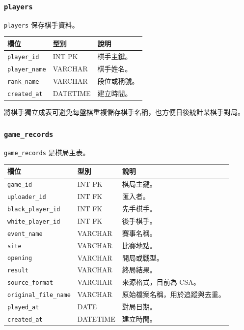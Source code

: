\documentclass[12pt,a4paper,fontset=none]{ctexart}
\begin{document}
\subsubsection{\texttt{players}}

\texttt{players} 保存棋手資料。

\begin{longtable}{p{}p{}p{}}
\toprule
\textbf{欄位} & \textbf{型別} & \textbf{說明}\\
\midrule
\endhead
\texttt{player\_id} & INT PK & 棋手主鍵。\\
\texttt{player\_name} & VARCHAR & 棋手姓名。\\
\texttt{rank\_name} & VARCHAR & 段位或稱號。\\
\texttt{created\_at} & DATETIME & 建立時間。\\
\bottomrule
\end{longtable}

將棋手獨立成表可避免每盤棋重複儲存棋手名稱，也方便日後統計某棋手對局。

\subsubsection{\texttt{game\_records}}

\texttt{game\_records} 是棋局主表。

\begin{longtable}{p{}p{}p{}}
\toprule
\textbf{欄位} & \textbf{型別} & \textbf{說明}\\
\midrule
\endhead
\texttt{game\_id} & INT PK & 棋局主鍵。\\
\texttt{uploader\_id} & INT FK & 匯入者。\\
\texttt{black\_player\_id} & INT FK & 先手棋手。\\
\texttt{white\_player\_id} & INT FK & 後手棋手。\\
\texttt{event\_name} & VARCHAR & 賽事名稱。\\
\texttt{site} & VARCHAR & 比賽地點。\\
\texttt{opening} & VARCHAR & 開局或戰型。\\
\texttt{result} & VARCHAR & 終局結果。\\
\texttt{source\_format} & VARCHAR & 來源格式，目前為 CSA。\\
\texttt{original\_file\_name} & VARCHAR & 原始檔案名稱，用於追蹤與去重。\\
\texttt{played\_at} & DATE & 對局日期。\\
\texttt{created\_at} & DATETIME & 建立時間。\\
\bottomrule
\end{longtable}
\end{document}
